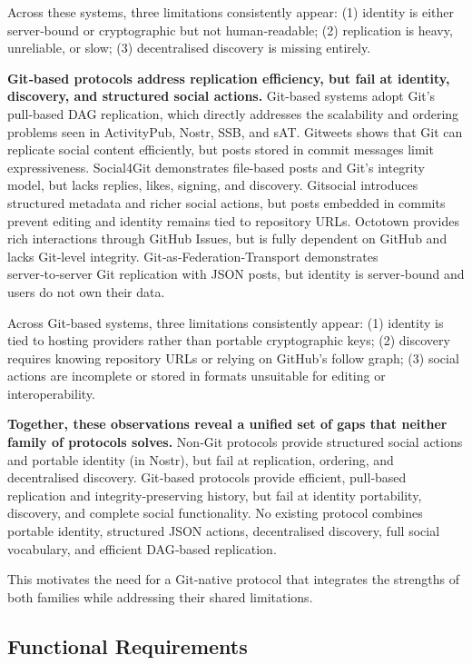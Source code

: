 Across these systems, three limitations consistently appear:  
(1) identity is either server‑bound or cryptographic but not human‑readable;  
(2) replication is heavy, unreliable, or slow;  
(3) decentralised discovery is missing entirely.

\textbf{Git‑based protocols address replication efficiency, but fail at identity, discovery, and
structured social actions.}
Git-based systems adopt Git’s pull‑based DAG replication, which directly addresses the scalability
and ordering problems seen in ActivityPub, Nostr, SSB, and sAT. Gitweets shows that Git can
replicate social content efficiently, but posts stored in commit messages limit expressiveness.
Social4Git demonstrates file‑based posts and Git’s integrity model, but lacks replies, likes, signing,
and discovery. Gitsocial introduces structured metadata and richer social actions, but posts embedded
in commits prevent editing and identity remains tied to repository URLs. Octotown provides rich
interactions through GitHub Issues, but is fully dependent on GitHub and lacks Git‑level integrity.
Git‑as‑Federation‑Transport demonstrates server‑to‑server Git replication with JSON posts, but
identity is server‑bound and users do not own their data.

Across Git‑based systems, three limitations consistently appear:  
(1) identity is tied to hosting providers rather than portable cryptographic keys;  
(2) discovery requires knowing repository URLs or relying on GitHub’s follow graph;  
(3) social actions are incomplete or stored in formats unsuitable for editing or interoperability.

\textbf{Together, these observations reveal a unified set of gaps that neither family of protocols
solves.}
Non‑Git protocols provide structured social actions and portable identity (in Nostr), but fail at
replication, ordering, and decentralised discovery. Git‑based protocols provide efficient, pull‑based
replication and integrity‑preserving history, but fail at identity portability, discovery, and complete
social functionality. No existing protocol combines portable identity, structured JSON actions,
decentralised discovery, full social vocabulary, and efficient DAG‑based replication.

This motivates the need for a Git‑native protocol that integrates the strengths of both families while
addressing their shared limitations.

\subsection{Functional Requirements}

